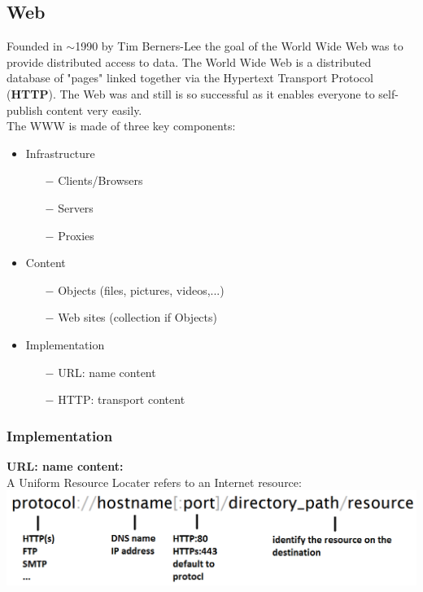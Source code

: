 \documentclass[a4paper, fontsize=8pt, landscape, DIV=1]{scrartcl}
\begin{document}
\begin{multicols*}{4}
		\subsection{Web}
		Founded in $\sim$1990 by Tim Berners-Lee the goal of the World Wide Web was to
		provide distributed access to data. The World Wide Web is a distributed database
		of "pages" linked together via the Hypertext Transport Protocol (\textbf{HTTP}).
		The Web was and still is so successful as it enables everyone to self-publish
		content very easily.\\
		The WWW is made of three key components: 
		\begin{itemize}[noitemsep]
			\item Infrastructure
			\begin{itemize}
				\item[$-$] Clients/Browsers
				\item[$-$] Servers
				\item[$-$] Proxies
			\end{itemize}
			\item Content
			\begin{itemize}
				\item[$-$] Objects (files, pictures, videos,...)
				\item[$-$] Web sites (collection if Objects)
			\end{itemize}
			\item Implementation
			\begin{itemize}
				\item[$-$] URL: name content
				\item[$-$] HTTP: transport content
			\end{itemize}
		\end{itemize}
		
		\subsubsection{Implementation}
		\textbf{URL: name content:}\\
		A Uniform Resource Locater refers to an Internet resource:\\
		\includegraphics[width=\columnwidth]{images/Application_Layer/web_url.png}
		\par 
		

\end{multicols*}
\end{document}
